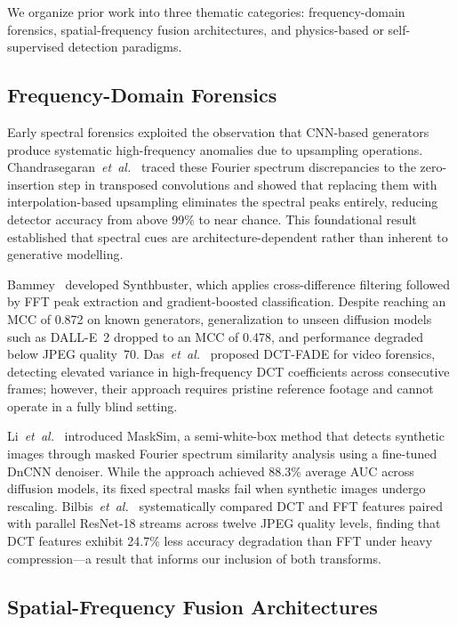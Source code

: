 \documentclass[conference]{IEEEtran}
\begin{document}
We organize prior work into three thematic categories: frequency-domain forensics, spatial-frequency fusion architectures, and physics-based or self-supervised detection paradigms.

\subsection{Frequency-Domain Forensics}

Early spectral forensics exploited the observation that CNN-based generators produce systematic high-frequency anomalies due to upsampling operations. Chandrasegaran~\emph{et~al.}~\cite{chandrasegaran2021fourier} traced these Fourier spectrum discrepancies to the zero-insertion step in transposed convolutions and showed that replacing them with interpolation-based upsampling eliminates the spectral peaks entirely, reducing detector accuracy from above 99\% to near chance. This foundational result established that spectral cues are architecture-dependent rather than inherent to generative modelling.

Bammey~\cite{bammey2023synthbuster} developed Synthbuster, which applies cross-difference filtering followed by FFT peak extraction and gradient-boosted classification. Despite reaching an MCC of 0.872 on known generators, generalization to unseen diffusion models such as DALL-E~2 dropped to an MCC of 0.478, and performance degraded below JPEG quality~70. Das~\emph{et~al.}~\cite{das2023dctfade} proposed DCT-FADE for video forensics, detecting elevated variance in high-frequency DCT coefficients across consecutive frames; however, their approach requires pristine reference footage and cannot operate in a fully blind setting.

Li~\emph{et~al.}~\cite{li2024masksim} introduced MaskSim, a semi-white-box method that detects synthetic images through masked Fourier spectrum similarity analysis using a fine-tuned DnCNN denoiser. While the approach achieved 88.3\% average AUC across diffusion models, its fixed spectral masks fail when synthetic images undergo rescaling. Bilbis~\emph{et~al.}~\cite{bilbis2025dctvsfft} systematically compared DCT and FFT features paired with parallel ResNet-18 streams across twelve JPEG quality levels, finding that DCT features exhibit 24.7\% less accuracy degradation than FFT under heavy compression---a result that informs our inclusion of both transforms.

\subsection{Spatial-Frequency Fusion Architectures}
\end{document}
